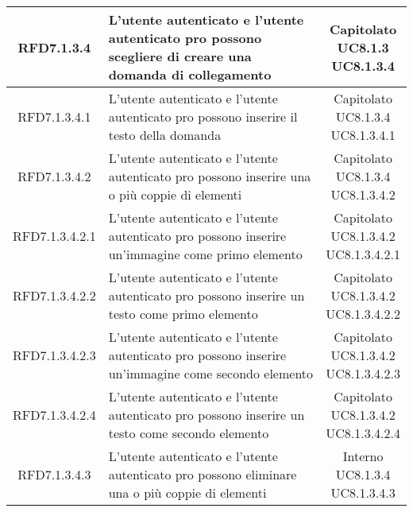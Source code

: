 \begin{longtable}{|c|>{\centering}m{7cm}|c|}
			 \hypertarget{{RFD7.1.3.4}}{{RFD7.1.3.4}} & L’utente autenticato e l’utente autenticato pro possono scegliere di creare una domanda di collegamento & \makecell{Capitolato\\ UC8.1.3 \\UC8.1.3.4 } \\ \hline
			 \hypertarget{{RFD7.1.3.4.1}}{{RFD7.1.3.4.1}} & L’utente autenticato e l'utente autenticato pro possono inserire il testo della domanda & \makecell{Capitolato\\ UC8.1.3.4 \\UC8.1.3.4.1 } \\ \hline
			 \hypertarget{{RFD7.1.3.4.2}}{{RFD7.1.3.4.2}} & L’utente autenticato e l'utente autenticato pro possono inserire una o più coppie di elementi & \makecell{Capitolato\\ UC8.1.3.4 \\UC8.1.3.4.2 } \\ \hline
			 \hypertarget{{RFD7.1.3.4.2.1}}{{RFD7.1.3.4.2.1}} & L’utente autenticato e l'utente autenticato pro possono inserire un’immagine come primo elemento & \makecell{Capitolato\\ UC8.1.3.4.2 \\UC8.1.3.4.2.1 } \\ \hline
			 \hypertarget{{RFD7.1.3.4.2.2}}{{RFD7.1.3.4.2.2}} & L’utente autenticato e l'utente autenticato pro possono inserire un testo come primo elemento & \makecell{Capitolato\\ UC8.1.3.4.2 \\UC8.1.3.4.2.2 } \\ \hline
			 \hypertarget{{RFD7.1.3.4.2.3}}{{RFD7.1.3.4.2.3}} & L’utente autenticato e l'utente autenticato pro possono inserire un’immagine come secondo elemento & \makecell{Capitolato\\ UC8.1.3.4.2 \\UC8.1.3.4.2.3 } \\ \hline
			 \hypertarget{{RFD7.1.3.4.2.4}}{{RFD7.1.3.4.2.4}} & L’utente autenticato e l'utente autenticato pro possono inserire un testo come secondo elemento & \makecell{Capitolato\\ UC8.1.3.4.2 \\UC8.1.3.4.2.4 } \\ \hline
			 \hypertarget{{RFD7.1.3.4.3}}{{RFD7.1.3.4.3}} & L’utente autenticato e l'utente autenticato pro possono eliminare una o più coppie di elementi  & \makecell{Interno\\ UC8.1.3.4 \\UC8.1.3.4.3 } \\ \hline

\end{longtable}
